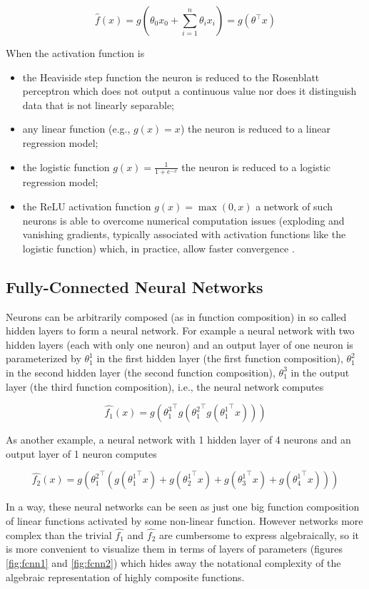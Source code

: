 $$
\hat{f}(x) = g(\theta_0 x_0 + \sum_{i=1}^{n}{\theta_i x_i}) = g(\theta^{\top} x)
$$

When the activation function is

\begin{itemize}
    \item the Heaviside step function the neuron is reduced to the Rosenblatt perceptron \cite{perceptron} which does not output a continuous value nor does it distinguish data that is not linearly separable;
    \item any linear function (e.g., $g(x) = x$) the neuron is reduced to a linear regression model;
    \item the logistic function $g(x) = \frac{1}{1 + e^{-x}}$ the neuron is reduced to a logistic regression model;
    \item the ReLU activation function $g(x) = \max(0, x)$ a network of such neurons is able to overcome numerical computation issues (exploding and vanishing gradients, typically associated with activation functions like the logistic function) which, in practice, allow faster convergence \cite{alexnet}.
\end{itemize}

\subsection{Fully-Connected Neural Networks}

Neurons can be arbitrarily composed (as in function composition) in so called hidden layers to form a neural network. For example a neural network with two hidden layers (each with only one neuron) and an output layer of one neuron is parameterized by $\theta^1_1$ in the first hidden layer (the first function composition), $\theta^2_1$ in the second hidden layer (the second function composition), $\theta^3_1$ in the output layer (the third function composition), i.e., the neural network computes

$$
\hat{f_1}(x) = g({\theta^3_1}^{\top} g({\theta^2_1}^{\top} g({\theta^1_1}^{\top} x)))
$$


As another example, a neural network with 1 hidden layer of 4 neurons and an output layer of 1 neuron computes

$$
\hat{f_2}(x) = g({\theta^2_1}^{\top} (g({\theta^1_1}^{\top} x) + g({\theta^1_2}^{\top} x) + g({\theta^1_3}^{\top} x) + g({\theta^1_4}^{\top} x)))
$$

In a way, these neural networks can be seen as just one big function composition of linear functions activated by some non-linear function. However networks more complex than the trivial $\hat{f_1}$ and $\hat{f_2}$ are cumbersome to express algebraically, so it is more convenient to visualize them in terms of layers of parameters (figures \ref{fig:fcnn1} and \ref{fig:fcnn2}) which hides away the notational complexity of the algebraic representation of highly composite functions.

